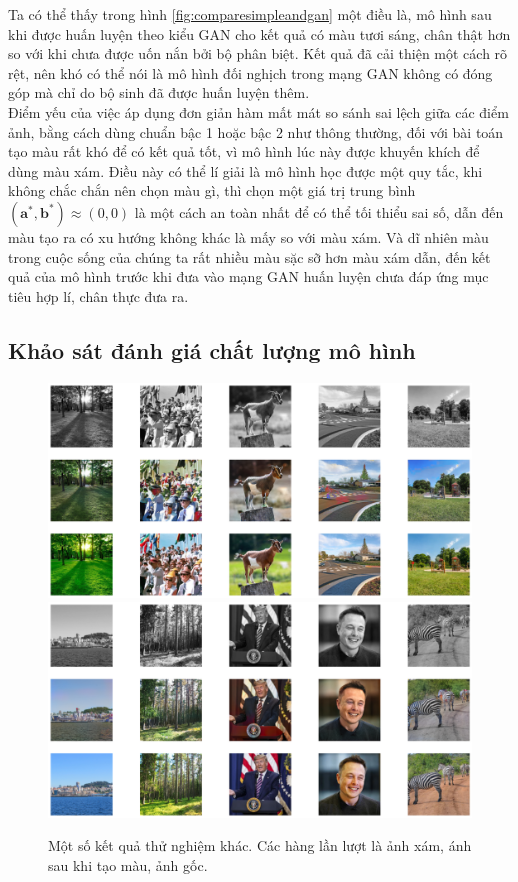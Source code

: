 \documentclass[a4paper, 12pt]{article}
\begin{document}
\noindent
Ta có thể thấy trong hình \ref{fig:comparesimpleandgan} một điều là, mô hình sau khi được huấn luyện theo kiểu GAN cho kết quả có màu tươi sáng, chân thật hơn so với khi chưa được uốn nắn bởi bộ phân biệt. Kết quả đã cải thiện một cách rõ rệt, nên khó có thể nói là mô hình đối nghịch trong mạng GAN không có đóng góp mà chỉ do bộ sinh đã được huấn luyện thêm.\vspace{5pt}\\
Điểm yếu của việc áp dụng đơn giản hàm mất mát so sánh sai lệch giữa các điểm ảnh, bằng cách dùng chuẩn bậc 1 hoặc bậc 2 như thông thường, đối với bài toán tạo màu rất khó để có kết quả tốt, vì mô hình lúc này được khuyến khích để dùng màu xám. Điều này có thể lí giải là mô hình học được một quy tắc, khi không chắc chắn nên chọn màu gì, thì chọn một giá trị trung bình $(\mathbf{a^*}, \mathbf{b^*}) \approx (0, 0)$ là một cách an toàn nhất để có thể tối thiểu sai số, dẫn đến màu tạo ra có xu hướng không khác là mấy so với màu xám. Và dĩ nhiên màu trong cuộc sống của chúng ta rất nhiều màu sặc sỡ hơn màu xám dẫn, đến kết quả của mô hình trước khi đưa vào mạng GAN huấn luyện chưa đáp ứng mục tiêu hợp lí, chân thực đưa ra.

\subsection{Khảo sát đánh giá chất lượng mô hình}

\begin{figure}[!h]
\captionsetup{width=0.8\textwidth}
\centering
\includegraphics[width=15cm]{images/demo1.png}
\includegraphics[width=15cm]{images/demo2.png}
\caption{Một số kết quả thử nghiệm khác. Các hàng lần lượt là ảnh xám, ánh sau khi tạo màu, ảnh gốc.}
\label{fig:moreresults}
\end{figure}
\end{document}
